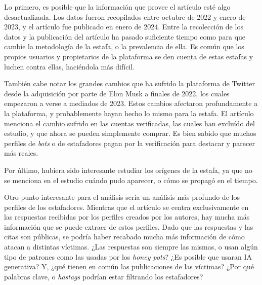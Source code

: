 \documentclass[es]{uc3mreport}
\begin{document}
\begin{report}
        \noindent
        Lo primero, es posible que la información que provee el artículo esté algo desactualizada. Los datos fueron recopilados entre octubre de 2022 y enero de 2023, y el artículo fue publicado en enero de 2024. Entre la recolección de los datos y la publicación del artículo ha pasado suficiente tiempo como para que cambie la metodología de la estafa, o la prevalencia de ella. Es común que los propios usuarios y propietarios de la plataforma se den cuenta de estas estafas y luchen contra ellas, haciéndola más difícil.

        También cabe notar los grandes cambios que ha sufrido la plataforma de Twitter desde la adquisición por parte de Elon Musk a finales de 2022, los cuales empezaron a verse a mediados de 2023. Estos cambios afectaron profundamente a la plataforma, y probablemente hayan hecho lo mismo para la estafa. El artículo menciona el cambio sufrido en las cuentas verificadas, las cuales han excluído del estudio, y que ahora se pueden simplemente comprar. Es bien sabido que muchos perfiles de \textit{bots} o de estafadores pagan por la verificación para destacar y parecer más reales.

        Por último, hubiera sido interesante estudiar los orígenes de la estafa, ya que no se menciona en el estudio cuándo pudo aparecer, o cómo se propagó en el tiempo.

        Otro punto interesante para el análisis sería un análisis más profundo de los perfiles de los estafadores. Mientras que el artículo se centra exclusivamente en las respuestas recibidas por los perfiles creados por los autores, hay mucha más información que se puede extraer de estos perfiles. Dado que las respuestas y las citas son públicas, se podría haber recabado mucha más información de cómo atacan a distintas víctimas. ¿Las respuestas son siempre las mismas, o usan algún tipo de patrones como las usadas por los \textit{honey pots}? ¿Es posible que usaran IA generativa? Y, ¿qué tienen en común las publicaciones de las víctimas? ¿Por qué palabras clave, o \textit{hastags} podrían estar filtrando los estafadores?


\end{report}
\end{document}
